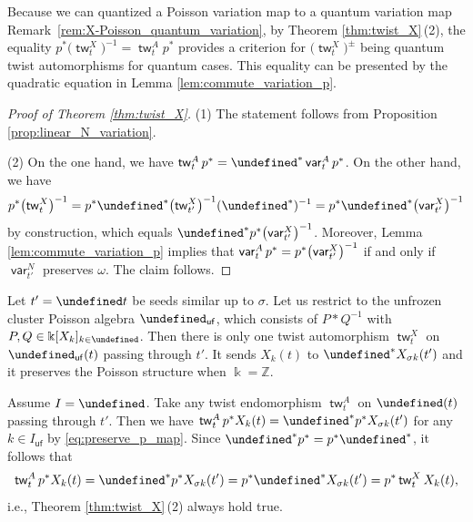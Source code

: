 \documentclass[10pt,a4paper]{amsart}
\newcommand{\kk}{\Bbbk}
\newcommand{\Z}{\mathbb{Z}}
\renewcommand{\tilde}[1]{\widetilde{#1}}
\newcommand{\opname}[1]{\operatorname{\mathsf{#1}}}
\newcommand{\tw}{{\tilde{w}}}
\newcommand{\var}{\opname{var}}
\newcommand{\ufv}{\opname{uf}}
\let\Iufv\undefined
\let\upClAlg\undefined
\let\XClAlg\undefined
\let\seq\undefined
\renewcommand{\tw}{\opname{tw}}
\newcommand{\Iufv}{I_{\ufv}}
\newcommand{\upClAlg}{\mathcal{U}^A}
\newcommand{\XClAlg}{\mathcal{U}^X}
\newcommand{\seq}{\boldsymbol{\mu}}%
\renewcommand{\tw}{\opname{tw}}
\numberwithin{equation}{section}
\begin{document}
Because we can quantized a Poisson variation map to a quantum variation map Remark~\ref{rem:X-Poisson_quantum_variation}, by Theorem \ref{thm:twist_X}\,(2), the equality $p^{*}\bigl(\tw_{t}^{X}\bigr)^{-1}=\tw_{t}^{A}p^{*}$ provides a criterion for $\bigl(\tw_{t}^{X}\bigr)^\pm$ being quantum twist automorphisms for quantum cases. This equality can be presented by the quadratic equation in Lemma \ref{lem:commute_variation_p}.


\begin{proof}[Proof of Theorem \ref{thm:twist_X}]

(1) The statement follows from Proposition \ref{prop:linear_N_variation}.

(2) On the one hand, we have $\tw_{t}^{A}p^{*}=\seq^{*}\var_{t}^{A}p^{*}$.
On the other hand, we have \[p^{*}\bigl(\tw_{t}^{X}\bigr)^{-1}=p^{*}\seq^{*}\bigl(\tw_{t'}^{X}\bigr)^{-1}(\seq^{*})^{-1}=p^{*}\seq^{*}\bigl(\var_{t'}^{X}\bigr)^{-1}\]
by construction, which equals $\seq^{*}p^{*}\bigl(\var_{t'}^{X}\bigr)^{-1}$.
Moreover, Lemma \ref{lem:commute_variation_p} implies that $\var_{t}^{A}p^{*}=\allowbreak\smash{p^{*}\bigl(\var_{t'}^{X}\bigr)^{-1}}$
if and only if $\var_{t'}^{N}$ preserves $\omega$. The claim follows.
\end{proof}


\begin{Remark}
Let $t'=\seq t$ be seeds similar up to $\sigma$. Let us restrict
to the unfrozen cluster Poisson algebra $\XClAlg_{\ufv}$, which consists of $P*Q^{-1}$ with~$P,Q\in \kk[X_k]_{k\in \Iufv}$. Then there is only one twist automorphism $\tw_{t}^{X}$ on $\XClAlg_{\ufv}(t)$
passing through $t'$. It sends $X_{k}(t)$ to $\seq^{*}X_{\sigma k}(t')$
and it preserves the Poisson structure when $\kk=\Z$.

Assume $I=\Iufv$. Take any twist endomorphism $\tw_{t}^{A}$ on $\upClAlg(t)$
passing through $t'$. Then we have $\tw_{t}^{A}p^{*}X_{k}(t)=\seq^{*}p^{*}X_{\sigma k}(t')$
for any $k\in I_{\ufv}$ by \eqref{eq:preserve_p_map}. Since $\seq^{*}p^{*}=p^{*}\seq^{*}$,
it follows that \[\tw_{t}^{A}p^{*}X_{k}(t)=\seq^{*}p^{*}X_{\sigma k}(t')=p^{*}\seq^{*}X_{\sigma k}(t')=p^{*}\tw_{t}^{X}X_{k}(t),\]
i.e., Theorem \ref{thm:twist_X}\,(2) always hold true.
\end{Remark}
\end{document}
